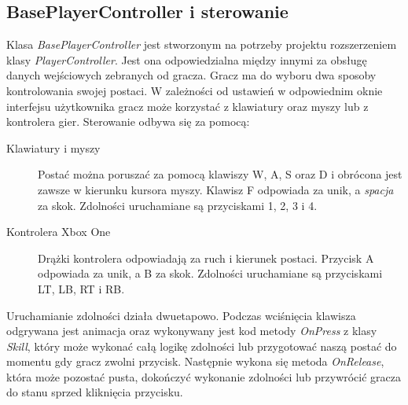 \documentclass[multip]{SGGW-thesis}
\begin{document}
	\subsection{BasePlayerController i sterowanie }
	Klasa  {\em BasePlayerController} jest stworzonym na potrzeby projektu rozszerzeniem klasy  {\em PlayerController}. Jest ona odpowiedzialna między innymi za obsługę danych wejściowych zebranych od gracza. 
Gracz ma do wyboru dwa sposoby kontrolowania swojej postaci. W zależności od ustawień w odpowiednim oknie interfejsu użytkownika gracz może korzystać z klawiatury oraz myszy lub z kontrolera gier. Sterowanie odbywa się za pomocą:
\begin{description}
\item[Klawiatury i myszy]
Postać można poruszać za pomocą klawiszy W, A, S oraz D i obrócona jest zawsze w kierunku kursora myszy. Klawisz F odpowiada za unik, a {\em spacja} za skok. Zdolności uruchamiane są przyciskami 1, 2, 3 i 4.
\item[Kontrolera Xbox One]
Drążki kontrolera odpowiadają za ruch i kierunek postaci. Przycisk A odpowiada za unik, a B za skok. Zdolności uruchamiane są przyciskami LT, LB, RT i RB.
\end{description}
Uruchamianie zdolności działa dwuetapowo. Podczas wciśnięcia klawisza odgrywana jest animacja oraz wykonywany jest kod metody {\em OnPress} z klasy {\em Skill}, który może wykonać całą logikę zdolności lub przygotować naszą postać do momentu gdy gracz zwolni przycisk. Następnie wykona się metoda {\em OnRelease}, która może pozostać pusta, dokończyć wykonanie zdolności lub przywrócić gracza do stanu sprzed kliknięcia przycisku.
\end{document}
